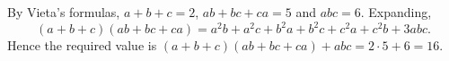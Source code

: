 By Vieta's formulas, $a+b+c=2$, $ab+bc+ca=5$ and $abc=6$. Expanding,
\[(a+b+c)(ab+bc+ca)=a^2b+a^2c+b^2a+b^2c+c^2a+c^2b+3abc.\]
Hence the required value is $(a+b+c)(ab+bc+ca)+abc=2\cdot5+6=\boxed{16}$.
